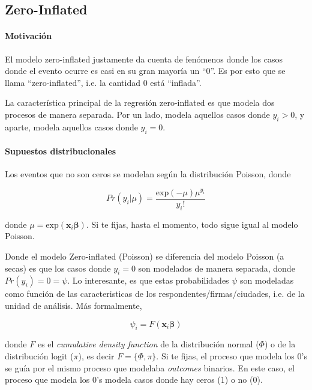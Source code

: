 \documentclass[onesided]{article}\usepackage[]{graphicx}\usepackage[]{color}
\begin{document}
\subsection{Zero-Inflated}

\paragraph{Motivaci\'on} El modelo zero-inflated justamente da cuenta de fen\'omenos donde los casos donde el evento ocurre es casi en su gran mayor\'ia un ``0''. Es por esto que se llama ``zero-inflated'', i.e. la cantidad 0 est\'a ``inflada''.

La caracter\'istica principal de la regresi\'on zero-inflated es que modela dos procesos de manera separada. Por un lado, modela aquellos casos donde $y_{i}>0$, y aparte, modela aquellos casos donde $y_{i}=0$. 

\paragraph{Supuestos distribucionales} Los eventos que no son ceros se modelan seg\'un la distribuci\'on Poisson, donde


\begin{equation}\label{poisson:d}
Pr(y_{i}|\mu) = \frac{\text{exp}(-\mu)\mu^{y_{i}}}{y_{i}!}
\end{equation}

donde $\mu=\text{exp}(\boldsymbol{x}_{i}\boldsymbol{\beta})$. Si te fijas, hasta el momento, todo sigue igual al modelo Poisson. 

Donde el modelo Zero-inflated (Poisson) se diferencia del modelo Poisson (a secas) es que los casos donde $y_{i}=0$ son modelados de manera separada, donde $Pr(y_{i})=0=\psi$. Lo interesante, es que estas probabilidades $\psi$ son modeladas como funci\'on de las caracteristicas de los respondentes/firmas/ciudades, i.e. de la unidad de an\'alisis. M\'as formalmente,


\begin{equation}\label{psi:p}
\psi_{i} = F(\boldsymbol{x}_{i}\boldsymbol{\beta})
\end{equation}

donde $F$ es el \emph{cumulative density function} de la distribuci\'on normal ($\Phi$) o de la distribuci\'on logit ($\pi$), es decir $F=\{\Phi, \pi\}$. Si te fijas, el proceso que modela los 0's se gu\'ia por el mismo proceso que modelaba \emph{outcomes} binarios. En este caso, el proceso que modela los 0's modela casos donde hay ceros (1) o no (0).
\end{document}
